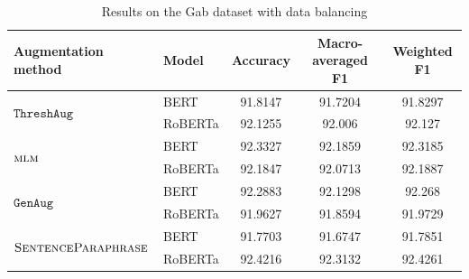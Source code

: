 \documentclass[11pt,a4paper]{article}
\newcommand{\senttfpara}{$\textsc{SentenceParaphrase}$}
\newcommand{\mlm}{$\textsc{mlm}$}
\newcommand{\genaug}{$\texttt{GenAug}$}
\newcommand{\threshaug}{$\texttt{ThreshAug}$}
\begin{document}
\begin{table}[]
    \small
    \centering
    \begin{tabular}{llccc}
        \toprule
        \textbf{Augmentation method} & \textbf{Model} & \textbf{Accuracy} & \textbf{Macro-averaged F1} & \textbf{Weighted F1} \\
        \midrule
        \multirow{2}{*}{\threshaug} & BERT & 91.8147 & 91.7204 & 91.8297 \\
         & RoBERTa & 92.1255 & 92.006 & 92.127 \\\midrule
        
        \multirow{2}{*}{\mlm} & BERT & 92.3327 & 92.1859 & 92.3185 \\
         & RoBERTa & 92.1847 & 92.0713 & 92.1887 \\\midrule
        
        \multirow{2}{*}{\genaug} & BERT & 92.2883 & 92.1298 & 92.268 \\
         & RoBERTa & 91.9627 & 91.8594 & 91.9729 \\\midrule
        
        \multirow{2}{*}{\senttfpara} & BERT & 91.7703 & 91.6747 & 91.7851 \\
         & RoBERTa & 92.4216 & 92.3132 & 92.4261 \\
        \bottomrule
    \end{tabular}
    \caption{Results on the Gab dataset with data balancing}
    \label{tab:gab15k}
\end{table}

\end{document}
